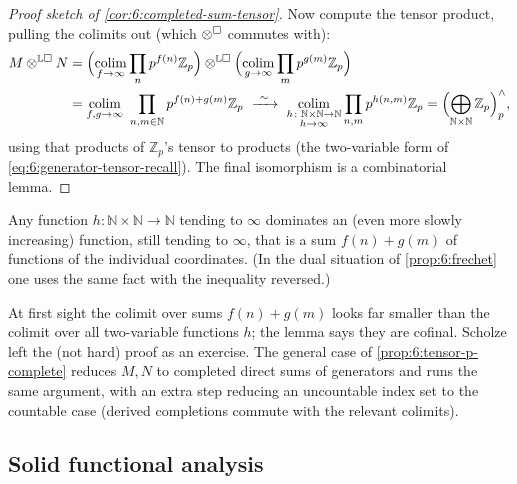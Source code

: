 \begin{proof}[Proof sketch of \cref{cor:6:completed-sum-tensor}]
Now compute the tensor product, pulling the colimits out (which
$\otimes^{\square}$ commutes with):
\begin{align}
\label{eq:6:tensor-colim}
M\otimes^{\mathbb{L}\solid}N
&=\Bigl(\operatorname*{colim}_{f\to\infty}\prod_{n}p^{f(n)}\mathbb{Z}_p\Bigr)
\otimes^{\mathbb{L}\solid}
\Bigl(\operatorname*{colim}_{g\to\infty}\prod_{m}p^{g(m)}\mathbb{Z}_p\Bigr) \notag\\
&=\operatorname*{colim}_{f,g\to\infty}\ \prod_{n,m\in\mathbb{N}}p^{f(n)+g(m)}\mathbb{Z}_p
\ \xrightarrow{\ \sim\ }\
\operatorname*{colim}_{\substack{h\colon\mathbb{N}\times\mathbb{N}\to\mathbb{N}\\ h\to\infty}}
\prod_{n,m}p^{h(n,m)}\mathbb{Z}_p
=\Bigl(\bigoplus_{\mathbb{N}\times\mathbb{N}}\mathbb{Z}_p\Bigr)^{\wedge}_{p},
\end{align}
using that products of $\mathbb{Z}_p$'s tensor to products (the two-variable form
of \eqref{eq:6:generator-tensor-recall}). The final isomorphism is a
combinatorial lemma.
\end{proof}

\begin{lemma}
\label{lem:6:combinatorial}
Any function $h\colon\mathbb{N}\times\mathbb{N}\to\mathbb{N}$ tending to $\infty$
dominates an (even more slowly increasing) function, still tending to $\infty$,
that is a sum $f(n)+g(m)$ of functions of the individual coordinates. (In the
dual situation of \cref{prop:6:frechet} one uses the same fact with the
inequality reversed.)
\end{lemma}

At first sight the colimit over sums $f(n)+g(m)$ looks far smaller than the
colimit over all two-variable functions $h$; the lemma says they are cofinal.
Scholze left the (not hard) proof as an exercise. The general case of
\cref{prop:6:tensor-p-complete} reduces $M,N$ to completed direct sums of
generators and runs the same argument, with an extra step reducing an uncountable
index set to the countable case (derived completions commute with the relevant
colimits).

\subsection{Solid functional analysis}


